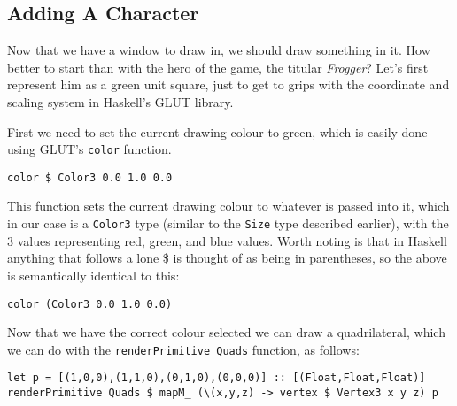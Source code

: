 \documentclass[12pt, a4paper]{report}
\begin{document}
\subsection{Adding A Character}

Now that we have a window to draw in, we should draw something in it.
How better to start than with the hero of the game, the titular \textit{Frogger}?
Let's first represent him as a green unit square, just to get to grips with the coordinate and scaling system in Haskell's GLUT library.

\par

First we need to set the current drawing colour to green, which is easily done using GLUT's \verb|color| function.

\begin{lstlisting}
color $ Color3 0.0 1.0 0.0
\end{lstlisting}

This function sets the current drawing colour to whatever is passed into it, which in our case is a \verb|Color3| type (similar to the \verb|Size| type described earlier), with the 3 values representing red, green, and blue values.
Worth noting is that in Haskell anything that follows a lone \$ is thought of as being in parentheses, so the above is semantically identical to this:

\begin{lstlisting}
color (Color3 0.0 1.0 0.0)
\end{lstlisting}

Now that we have the correct colour selected we can draw a quadrilateral, which we can do with the \verb|renderPrimitive Quads| function, as follows:

\begin{lstlisting}[xleftmargin=-0.1\textwidth, xrightmargin=-0.1\textwidth]
let p = [(1,0,0),(1,1,0),(0,1,0),(0,0,0)] :: [(Float,Float,Float)]
renderPrimitive Quads $ mapM_ (\(x,y,z) -> vertex $ Vertex3 x y z) p
\end{lstlisting}
\end{document}
